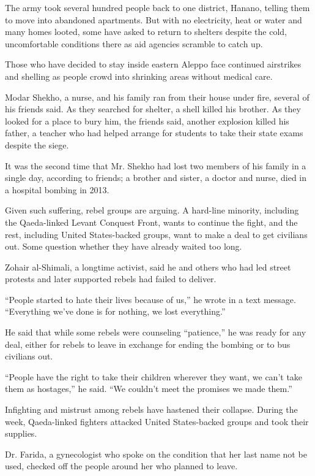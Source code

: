 The army took several hundred people back to one district, Hanano,
telling them to move into abandoned apartments. But with no electricity,
heat or water and many homes looted, some have asked to return to
shelters despite the cold, uncomfortable conditions there as aid
agencies scramble to catch up.

Those who have decided to stay inside eastern Aleppo face continued
airstrikes and shelling as people crowd into shrinking areas without
medical care.

Modar Shekho, a nurse, and his family ran from their house under fire,
several of his friends said. As they searched for shelter, a shell
killed his brother. As they looked for a place to bury him, the friends
said, another explosion killed his father, a teacher who had helped
arrange for students to take their state exams despite the siege.

It was the second time that Mr. Shekho had lost two members of his
family in a single day, according to friends; a brother and sister, a
doctor and nurse, died in a hospital bombing in 2013.

Given such suffering, rebel groups are arguing. A hard-line minority,
including the Qaeda-linked Levant Conquest Front, wants to continue the
fight, and the rest, including United States-backed groups, want to make
a deal to get civilians out. Some question whether they have already
waited too long.

Zohair al-Shimali, a longtime activist, said he and others who had led
street protests and later supported rebels had failed to deliver.

``People started to hate their lives because of us,'' he wrote in a text
message. ``Everything we've done is for nothing, we lost everything.''

He said that while some rebels were counseling ``patience,'' he was
ready for any deal, either for rebels to leave in exchange for ending
the bombing or to bus civilians out.

``People have the right to take their children wherever they want, we
can't take them as hostages,'' he said. ``We couldn't meet the promises
we made them.''

Infighting and mistrust among rebels have hastened their collapse.
During the week, Qaeda-linked fighters attacked United States-backed
groups and took their supplies.

Dr. Farida, a gynecologist who spoke on the condition that her last name
not be used, checked off the people around her who planned to leave.

